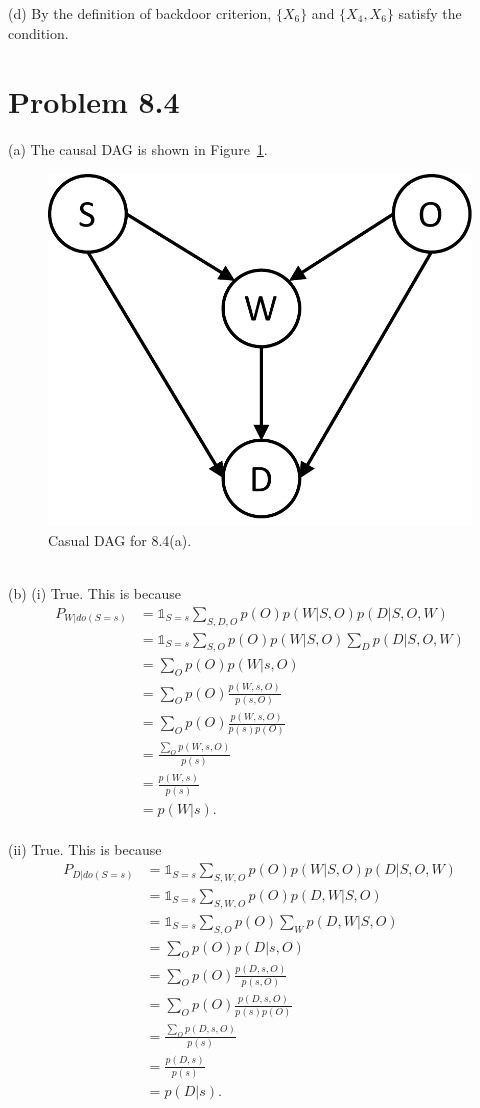 \documentclass{article}
\newcommand{\qeds}{\hfill\qedsymbol}
\begin{document}
\noindent
(d) By the definition of backdoor criterion, $\{X_6\}$ and $\{X_4, X_6\}$ satisfy the condition.

\pagebreak
\section*{Problem 8.4}
(a) The causal DAG is shown in Figure~\ref{f:84a}.
%
\begin{figure}[h!]
  \centering
  \includegraphics[width=0.3\columnwidth]{84a.pdf}
    \vspace{-0.1cm}
  \caption{Casual DAG for 8.4(a).}
  \label{f:84a}
\end{figure}
\\

\noindent
(b) (i) True. This is because
\begin{align*}
	P_{W|do(S=s)} 
	&= \mathds{1}_{S=s} \sum_{S, D, O} p(O)p(W|S,O)p(D|S,O, W)\\
	&= \mathds{1}_{S=s} \sum_{S, O} p(O)p(W|S,O) \sum_D p(D|S,O, W) \\
	&= \sum_{O} p(O)p(W|s,O) \\
	&= \sum_{O} p(O)\frac{p(W, s, O)}{p(s, O)} \\
	&= \sum_{O} p(O)\frac{p(W, s, O)}{p(s)p(O)}\\
	&= \frac{\sum_{O}p(W, s, O)}{p(s)} \\
	&= \frac{p(W,s)}{p(s)}\\
	&=p(W|s).
\end{align*} \qeds
\\
%

\noindent
(ii) True. This is because
\begin{align*}
	P_{D|do(S=s)} 
	&= \mathds{1}_{S=s} \sum_{S, W, O} p(O)p(W|S,O)p(D|S,O, W)\\
	&= \mathds{1}_{S=s} \sum_{S, W, O} p(O)p(D, W|S,O)  \\
	&= \mathds{1}_{S=s} \sum_{S, O}p(O) \sum_W  p(D, W|S,O)  \\
	&= \sum_{O} p(O)p(D|s,O) \\
	&= \sum_{O} p(O)\frac{p(D, s, O)}{p(s, O)} \\
	&= \sum_{O} p(O)\frac{p(D, s, O)}{p(s)p(O)}\\
	&= \frac{\sum_{O}p(D, s, O)}{p(s)} \\
	&= \frac{p(D,s)}{p(s)}\\
	&=p(D|s).
\end{align*}\qeds
\\
%
\end{document}
